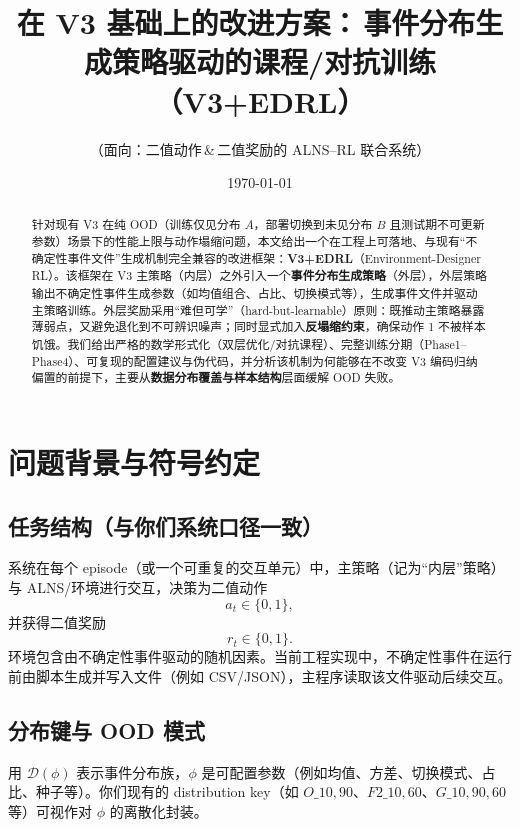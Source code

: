 \documentclass[UTF8,11pt,a4paper]{ctexart}
\title{在 V3 基础上的改进方案：\,\textbf{事件分布生成策略}驱动的课程/对抗训练（V3+EDRL）}
\author{（面向：二值动作\,\&\,二值奖励的 ALNS--RL 联合系统）}
\date{\today}
\begin{document}
\maketitle

\begin{abstract}
针对现有 V3 在纯 OOD（训练仅见分布 $A$，部署切换到未见分布 $B$ 且测试期不可更新参数）场景下的性能上限与动作塌缩问题，本文给出一个在工程上可落地、与现有``不确定性事件文件''生成机制完全兼容的改进框架：\textbf{V3+EDRL}（Environment-Designer RL）。该框架在 V3 主策略（内层）之外引入一个\textbf{事件分布生成策略}（外层），外层策略输出不确定性事件生成参数（如均值组合、占比、切换模式等），生成事件文件并驱动主策略训练。外层奖励采用``难但可学''（hard-but-learnable）原则：既推动主策略暴露薄弱点，又避免退化到不可辨识噪声；同时显式加入\textbf{反塌缩约束}，确保动作 1 不被样本饥饿。我们给出严格的数学形式化（双层优化/对抗课程）、完整训练分期（Phase1--Phase4）、可复现的配置建议与伪代码，并分析该机制为何能够在不改变 V3 编码归纳偏置的前提下，主要从\textbf{数据分布覆盖与样本结构}层面缓解 OOD 失败。
\end{abstract}

\tableofcontents
\newpage

\section{问题背景与符号约定}

\subsection{任务结构（与你们系统口径一致）}
系统在每个 episode（或一个可重复的交互单元）中，主策略（记为``内层''策略）与 ALNS/环境进行交互，决策为二值动作
\begin{equation}
 a_t \in \{0,1\},
\end{equation}
并获得二值奖励
\begin{equation}
 r_t \in \{0,1\}.
\end{equation}
环境包含由不确定性事件驱动的随机因素。当前工程实现中，不确定性事件在运行前由脚本生成并写入文件（例如 CSV/JSON），主程序读取该文件驱动后续交互。

\subsection{分布键与 OOD 模式}
用 $\mathcal{D}(\phi)$ 表示事件分布族，$\phi$ 是可配置参数（例如均值、方差、切换模式、占比、种子等）。你们现有的 distribution key（如 $O\_{10,90}$、$F2\_{10,60}$、$G\_{10,90,60}$ 等）可视作对 $\phi$ 的离散化封装。
\end{document}
